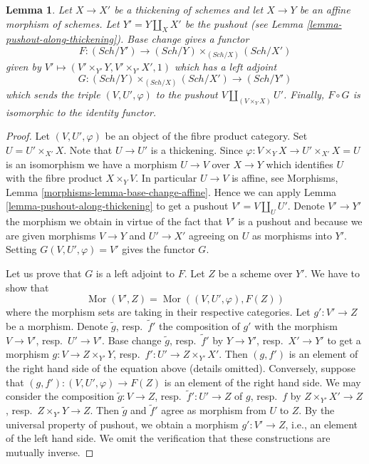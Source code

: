 \documentclass[10pt,a4paper]{amsart}
\theoremstyle{plain}
\newtheorem{lemma}[subsection]{Lemma}
\theoremstyle{definition}
\theoremstyle{remark}
\numberwithin{equation}{subsection}
\def\Sch{\mathit{Sch}}
\def\Mor{\mathop{\mathrm{Mor}}\nolimits}
\begin{document}
\begin{lemma}
\label{lemma-equivalence-categories-schemes-over-pushout}
Let $X \to X'$ be a thickening of schemes and let $X \to Y$ be an
affine morphism of schemes. Let $Y' = Y \amalg_X X'$ be the pushout
(see Lemma \ref{lemma-pushout-along-thickening}). Base change gives
a functor
$$
F : (\Sch/Y') \longrightarrow (\Sch/Y) \times_{(\Sch/X)} (\Sch/X')
$$
given by $V' \longmapsto (V' \times_{Y'} Y, V' \times_{Y'} X', 1)$
which has a left adjoint
$$
G : (\Sch/Y) \times_{(\Sch/X)} (\Sch/X') \longrightarrow (\Sch/Y')
$$
which sends the triple $(V, U', \varphi)$ to the pushout
$V \amalg_{(V \times_Y X)} U'$. Finally, $F \circ G$ is isomorphic to the
identity functor.
\end{lemma}

\begin{proof}
Let $(V, U', \varphi)$ be an object of the fibre product category.
Set $U = U' \times_{X'} X$. Note that $U \to U'$ is a thickening.
Since $\varphi : V \times_Y X \to U' \times_{X'} X = U$ is an isomorphism
we have a morphism $U \to V$ over $X \to Y$ which identifies $U$ with
the fibre product $X \times_Y V$. In particular $U \to V$ is affine, see
Morphisms, Lemma \ref{morphisms-lemma-base-change-affine}.
Hence we can apply Lemma \ref{lemma-pushout-along-thickening}
to get a pushout $V' = V \amalg_U U'$. Denote $V' \to Y'$ the morphism
we obtain in virtue of the fact that $V'$ is a pushout and because
we are given morphisms $V \to Y$ and $U' \to X'$ agreeing on $U$
as morphisms into $Y'$. Setting $G(V, U', \varphi) = V'$
gives the functor $G$.

\medskip\noindent
Let us prove that $G$ is a left adjoint to $F$. Let $Z$ be a scheme
over $Y'$. We have to show that
$$
\Mor(V', Z) = \Mor((V, U', \varphi), F(Z))
$$
where the morphism sets are taking in their respective categories.
Let $g' : V' \to Z$ be a morphism. Denote $\tilde g$, resp.\ $\tilde f'$
the composition of $g'$ with the morphism $V \to V'$, resp.\ $U' \to V'$.
Base change $\tilde g$, resp.\ $\tilde f'$ by $Y \to Y'$, resp.\ $X' \to Y'$
to get a morphism $g : V \to Z \times_{Y'} Y$,
resp.\ $f' : U' \to Z \times_{Y'} X'$. Then $(g, f')$ is an element
of the right hand side of the equation above (details omitted).
Conversely, suppose that $(g, f') : (V, U', \varphi) \to F(Z)$ is an
element of the right hand side.
We may consider the composition $\tilde g : V \to Z$,
resp.\ $\tilde f' : U' \to Z$ of $g$, resp.\ $f$ by
$Z \times_{Y'} X' \to Z$, resp.\ $Z \times_{Y'} Y \to Z$.
Then $\tilde g$ and $\tilde f'$ agree as morphism from $U$ to $Z$.
By the universal property of pushout, we obtain a morphism
$g' : V' \to Z$, i.e., an element of the left hand side.
We omit the verification that these constructions are mutually inverse.


\end{proof}
\end{document}

